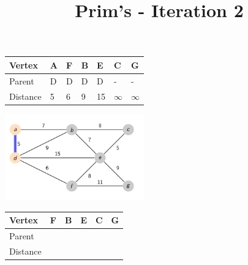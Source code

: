 \documentclass{beamer}
\begin{document}
\begin{frame}[fragile]
    \title{Prim's - Iteration 2}
    \centering
    \begin{table}[]
        \begin{tabular}{|l|l|l|l|l|l|l|}
            \hline
            Vertex   & A & F & B & E  & C        & G        \\ \hline
            Parent   & D & D & D & D  & -        & -        \\ \hline
            Distance & 5 & 6 & 9 & 15 & $\infty$ & $\infty$ \\ \hline
        \end{tabular}
    \end{table}
    \includegraphics[width=0.45\textwidth]{./imgs/prims_walkthrough/2.png}
    \begin{table}[]
        \begin{tabular}{|l|l|l|l|l|l|}
            \hline
            Vertex   & F & B & E  & C        & G        \\ \hline
            Parent   &  &  &      &          &         \\ \hline
            Distance &  &  &      &          &  \\ \hline
        \end{tabular}
    \end{table}

\end{frame}
\end{document}
